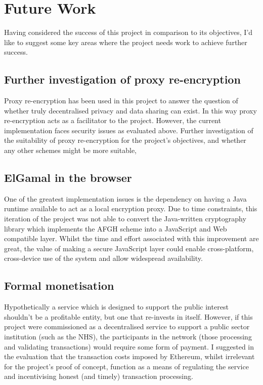 \section{Future Work}

Having considered the success of this project in comparison to its objectives, I'd like to suggest some key areas where the project needs work to achieve further success.

\subsection{Further investigation of proxy re-encryption}

Proxy re-encryption has been used in this project to answer the question of whether truly decentralised privacy and data sharing can exist. In this way proxy re-encryption acts as a facilitator to the project. However, the current implementation faces security issues as evaluated above. Further investigation of the suitability of proxy re-encryption for the project's objectives, and whether any other schemes might be more suitable,

\subsection{ElGamal in the browser}

One of the greatest implementation issues is the dependency on having a Java runtime available to act as a local encryption proxy. Due to time constraints, this iteration of the project was not able to convert the Java-written cryptography library which implements the AFGH scheme into a JavaScript and Web compatible layer. Whilst the time and effort associated with this improvement are great, the value of making a secure JavaScript layer could enable cross-platform, cross-device use of the system and allow widespread availability.

\subsection{Formal monetisation}

Hypothetically a service which is designed to support the public interest shouldn't be a profitable entity, but one that re-invests in itself. However, if this project were commissioned as a decentralised service to support a public sector institution (such as the NHS), the participants in the network (those processing and validating transactions) would require some form of payment. I suggested in the evaluation that the transaction costs imposed by Ethereum, whilst irrelevant for the project's proof of concept, function as a means of regulating the service and incentivising honest (and timely) transaction processing.

